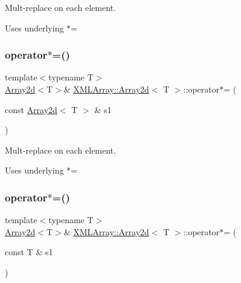 Mult-\/replace on each element. 

Uses underlying $\ast$= \mbox{\label{classXMLArray_1_1Array2d_a591d1e6e7de9fd024657bb6e9264a89b}} 
\subsubsection{\texorpdfstring{operator$\ast$=()}{operator*=()}\hspace{0.1cm}{\footnotesize\ttfamily [2/4]}}
{\footnotesize\ttfamily template$<$typename T$>$ \\
\mbox{\hyperlink{classXMLArray_1_1Array2d}{Array2d}}$<$T$>$\& \mbox{\hyperlink{classXMLArray_1_1Array2d}{X\+M\+L\+Array\+::\+Array2d}}$<$ T $>$\+::operator$\ast$= (\begin{DoxyParamCaption}\item[{const \mbox{\hyperlink{classXMLArray_1_1Array2d}{Array2d}}$<$ T $>$ \&}]{s1 }\end{DoxyParamCaption})\hspace{0.3cm}{\ttfamily [inline]}}



Mult-\/replace on each element. 

Uses underlying $\ast$= \mbox{\label{classXMLArray_1_1Array2d_aee0e6a53c2f9dcc263ba59286d359b38}} 
\subsubsection{\texorpdfstring{operator$\ast$=()}{operator*=()}\hspace{0.1cm}{\footnotesize\ttfamily [3/4]}}
{\footnotesize\ttfamily template$<$typename T$>$ \\
\mbox{\hyperlink{classXMLArray_1_1Array2d}{Array2d}}$<$T$>$\& \mbox{\hyperlink{classXMLArray_1_1Array2d}{X\+M\+L\+Array\+::\+Array2d}}$<$ T $>$\+::operator$\ast$= (\begin{DoxyParamCaption}\item[{const T \&}]{s1 }\end{DoxyParamCaption})\hspace{0.3cm}{\ttfamily [inline]}}



